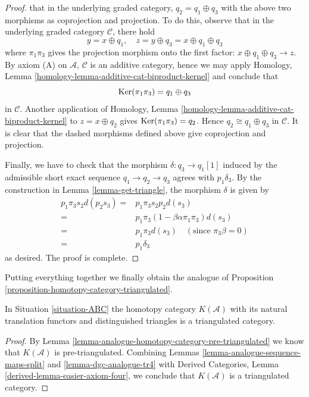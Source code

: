 \begin{proof}
that in the underlying graded category, $q_2 = q_1\oplus q_3$
with the above two morphisms as coprojection and projection.
To do this, observe that in the underlying graded category
$\mathcal{C}$, there hold
$$
y = x\oplus q_1,\quad
z = y\oplus q_3 = x\oplus q_1\oplus q_3
$$
where $\pi_1\pi_3$ gives the projection morphism onto the first
factor: $x\oplus q_1\oplus q_3\to z$. By axiom (A) on
$\mathcal{A}$, $\mathcal{C}$ is an additive category, hence
we may apply
Homology, Lemma \ref{homology-lemma-additive-cat-biproduct-kernel}
and conclude that
$$
\mathop{\mathrm{Ker}}(\pi_1\pi_3) = q_1\oplus q_3
$$
in $\mathcal{C}$. Another application of
Homology, Lemma \ref{homology-lemma-additive-cat-biproduct-kernel}
to $z = x\oplus q_2$ gives $\mathop{\mathrm{Ker}}(\pi_1\pi_3) = q_2$.
Hence $q_2\cong q_1\oplus q_3$ in $\mathcal{C}$.
It is clear that the dashed morphisms defined above give
coprojection and projection.

\medskip\noindent
Finally, we have to check that the morphism
$\delta : q_3 \to q_1[1]$ induced by the admissible
short exact sequence $q_1\to q_2\to q_3$ agrees with
$p_1\delta_3$. By the construction in
Lemma \ref{lemma-get-triangle}, the morphism $\delta$ is given by
\begin{align*}
p_1\pi_3s_2d(p_2s_3)
= &
p_1\pi_3s_2p_2d(s_3) \\
= &
p_1\pi_3(1-\beta\alpha\pi_1\pi_3)d(s_3) \\
= &
p_1\pi_3d(s_3)\quad (\text{since }\pi_3\beta = 0) \\
= &
p_1\delta_3
\end{align*}
as desired. The proof is complete.
\end{proof}

\noindent
Putting everything together we finally obtain the analogue
of Proposition \ref{proposition-homotopy-category-triangulated}.

\begin{proposition}
\label{proposition-ABC-homotopy-category-triangulated}
In Situation \ref{situation-ABC} the homotopy category $K(\mathcal{A})$
with its natural translation functors and distinguished triangles is a
triangulated category.
\end{proposition}

\begin{proof}
By Lemma \ref{lemma-analogue-homotopy-category-pre-triangulated} we know that
$K(\mathcal{A})$ is pre-triangulated. Combining
Lemmas \ref{lemma-analogue-sequence-maps-split} and
\ref{lemma-dgc-analogue-tr4} with
Derived Categories, Lemma \ref{derived-lemma-easier-axiom-four},
we conclude that $K(\mathcal{A})$ is a triangulated category.
\end{proof}

